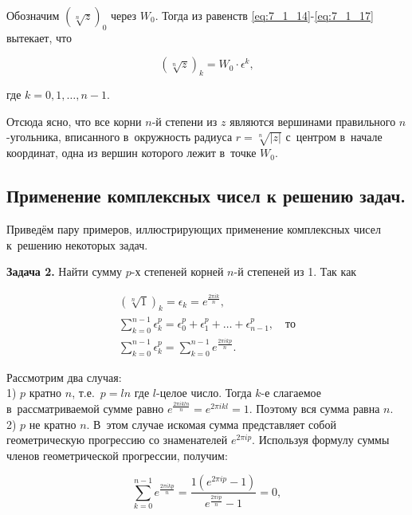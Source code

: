 \begin{figure}\label{fig:7_1_9}
\end{figure}

Обозначим $\left( \sqrt[\scriptstyle n]{z} \right)_{0}$ через $W_{0}$.
Тогда из равенств \eqref{eq:7_1_14}-\eqref{eq:7_1_17} вытекает, что

\begin{equation*}
\left( \sqrt[\scriptstyle n]{z} \right)_{k} = W_{0} \cdot \epsilon^{k}, 
\end{equation*}

\noindent
где $k = 0, 1, \dots, n-1$.

Отсюда ясно, что все корни $n$-й степени из $z$ являются вершинами правильного
$n$-угольника, вписанного в~окружность радиуса $r = \sqrt[\scriptstyle n]{|z|}$
с~центром в~начале координат, одна из вершин которого лежит в~точке $W_{0}$.


\subsection{Применение комплексных чисел к решению задач.}
Приведём пару примеров, иллюстрирующих применение комплексных чисел к~решению
некоторых задач.

\textbf{Задача 2.} Найти сумму $p$-х степеней корней $n$-й степеней из 1.
Так как

\begin{gather*}
\left( \sqrt[\scriptstyle n]{1}\right)_{k} = \epsilon_{k} = e^{\frac{2\pi i k}{n}}, \\
\sum\limits^{n-1}_{k=0} \epsilon^{p}_{k} = 
  \epsilon^{p}_{0} + \epsilon^{p}_{1} + \dots + \epsilon^{p}_{n-1}, \quad \text{то} \\
\sum\limits^{n-1}_{k=0} \epsilon^{p}_{k} = \sum\limits^{n-1}_{k=0}e^{\frac{2\pi i k p}{n}}.
\end{gather*}

Рассмотрим два случая:\\
1) $p$ кратно $n$, т.е.\ $p = ln$ где $l$-целое число. Тогда $k$-е слагаемое в~рассматриваемой
сумме равно $e^{\frac{2\pi i k ln}{n}} = e^{2\pi i k l} = 1$.
Поэтому вся сумма равна $n$.\\
2) $p$ не кратно $n$. В~этом случае искомая сумма представляет собой геометрическую прогрессию
со знаменателей $e^{2\pi i p}$. Используя формулу суммы членов геометрической прогрессии,
получим:

\begin{equation*}
\sum\limits^{n-1}_{k=0} e^{\frac{2\pi i k p}{n}} =
  \dfrac{1\left( e^{2\pi i p} - 1 \right)}{e^{\frac{2\pi i p}{n}} - 1} = 0,
\end{equation*}

